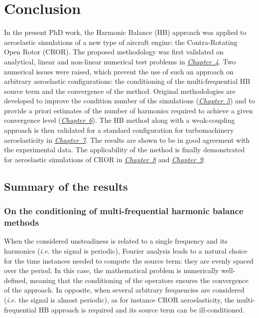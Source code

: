 
\chapter*{Conclusion}

In the present PhD work, the Harmonic Balance (HB) approach 
was applied to 
aeroelastic simulations of a new type of aircraft engine: 
the Contra-Rotating Open Rotor (CROR). The proposed methodology was
first validated on analytical, linear and non-linear 
numerical test problems in \hyperref[cha:validation_hb]{\emph{Chapter~4}}. 
Two numerical issues were raised, which prevent the use of such an approach 
on arbitrary aeroelastic configurations: the conditioning of
the multi-frequential HB source term and the
convergence of the method. Original methodologies are developed 
to improve the condition number of the simulations 
(\hyperref[cha:limitations_condition_number]{\emph{Chapter~5}})
and to provide a priori estimates of the number of harmonics 
required to achieve a given convergence level
(\hyperref[cha:limitations_convergence]{\emph{Chapter~6}}). 
The HB method along with a weak-coupling approach
is then validated for a standard configuration 
for turbomachinery aeroelasticity in \hyperref[cha:stcf11]{\emph{Chapter~7}}. 
The results are shown to be in good agreement 
with the experimental data. The applicability of the method 
is finally demonstrated for aeroelastic 
simulations of CROR
in \hyperref[cha:dream_ls_isolated]{\emph{Chapter~8}}
and \hyperref[cha:dream_hs_isolated]{\emph{Chapter~9}}.

\section*{Summary of the results}

\subsection*{On the conditioning of multi-frequential harmonic balance methods}

When the considered unsteadiness is related to a single frequency and its
harmonics (\emph{i.e.} the signal is periodic), 
Fourier analysis leads to a natural choice for the time instances
needed to compute the source term:
they are evenly spaced over the period. In this case, the mathematical
problem is numerically well-defined, meaning that the conditioning of
the operators ensures the convergence of the approach.
In opposite, when several arbitrary frequencies are 
considered (\emph{i.e.} the signal is almost periodic), as for instance CROR
aeroelasticity, the multi-frequential HB approach
is required and its source term can be ill-conditioned.

